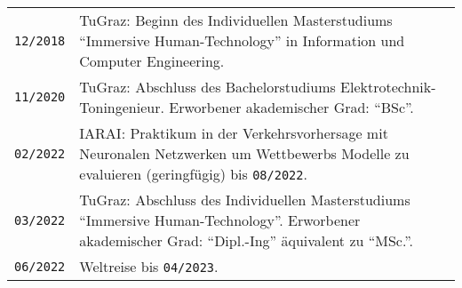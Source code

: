 {\begin{tabularx}{\columnwidth}{>{\centering\arraybackslash}p{1.5cm} | p{12cm}}
  \texttt{12/2018} & TuGraz: Beginn des Individuellen Masterstudiums \enquote{Immersive Human-Technology} in Information und Computer Engineering.\\
  \texttt{11/2020} & TuGraz: Abschluss des Bachelorstudiums Elektrotechnik-Toningenieur. Erworbener akademischer Grad: \enquote{BSc}.\\
  \texttt{02/2022} & IARAI: Praktikum in der Verkehrsvorhersage mit Neuronalen Netzwerken um Wettbewerbs Modelle zu evaluieren (geringfügig) bis \texttt{08/2022}.\\
  \texttt{03/2022} & TuGraz: Abschluss des Individuellen Masterstudiums \enquote{Immersive Human-Technology}. Erworbener akademischer Grad: \enquote{Dipl.-Ing} äquivalent zu \enquote{MSc.}.\\
  \texttt{06/2022} & Weltreise bis \texttt{04/2023}.\\
\end{tabularx}
}
